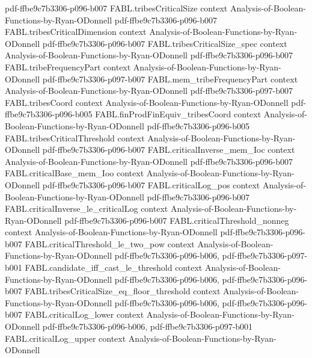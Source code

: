 \begin{theorem}
  {pdf-ffbe9c7b3306-p096-b007}
\proofstep
  {FABL.tribesCriticalSize}
  {context}
  {Analysis-of-Boolean-Functions-by-Ryan-ODonnell}
  {pdf-ffbe9c7b3306-p096-b007}
\proofstep
  {FABL.tribesCriticalDimension}
  {context}
  {Analysis-of-Boolean-Functions-by-Ryan-ODonnell}
  {pdf-ffbe9c7b3306-p096-b007}
\proofstep
  {FABL.tribesCriticalSize_spec}
  {context}
  {Analysis-of-Boolean-Functions-by-Ryan-ODonnell}
  {pdf-ffbe9c7b3306-p096-b007}
\proofstep
  {FABL.tribeFrequencyPart}
  {context}
  {Analysis-of-Boolean-Functions-by-Ryan-ODonnell}
  {pdf-ffbe9c7b3306-p097-b007}
\proofstep
  {FABL.mem_tribeFrequencyPart}
  {context}
  {Analysis-of-Boolean-Functions-by-Ryan-ODonnell}
  {pdf-ffbe9c7b3306-p097-b007}
\proofstep
  {FABL.tribesCoord}
  {context}
  {Analysis-of-Boolean-Functions-by-Ryan-ODonnell}
  {pdf-ffbe9c7b3306-p096-b005}
\proofstep
  {FABL.finProdFinEquiv_tribesCoord}
  {context}
  {Analysis-of-Boolean-Functions-by-Ryan-ODonnell}
  {pdf-ffbe9c7b3306-p096-b005}
\proofstep
  {FABL.tribesCriticalThreshold}
  {context}
  {Analysis-of-Boolean-Functions-by-Ryan-ODonnell}
  {pdf-ffbe9c7b3306-p096-b007}
\proofstep
  {FABL.criticalInverse_mem_Ioc}
  {context}
  {Analysis-of-Boolean-Functions-by-Ryan-ODonnell}
  {pdf-ffbe9c7b3306-p096-b007}
\proofstep
  {FABL.criticalBase_mem_Ioo}
  {context}
  {Analysis-of-Boolean-Functions-by-Ryan-ODonnell}
  {pdf-ffbe9c7b3306-p096-b007}
\proofstep
  {FABL.criticalLog_pos}
  {context}
  {Analysis-of-Boolean-Functions-by-Ryan-ODonnell}
  {pdf-ffbe9c7b3306-p096-b007}
\proofstep
  {FABL.criticalInverse_le_criticalLog}
  {context}
  {Analysis-of-Boolean-Functions-by-Ryan-ODonnell}
  {pdf-ffbe9c7b3306-p096-b007}
\proofstep
  {FABL.criticalThreshold_nonneg}
  {context}
  {Analysis-of-Boolean-Functions-by-Ryan-ODonnell}
  {pdf-ffbe9c7b3306-p096-b007}
\proofstep
  {FABL.criticalThreshold_le_two_pow}
  {context}
  {Analysis-of-Boolean-Functions-by-Ryan-ODonnell}
  {pdf-ffbe9c7b3306-p096-b006,
    pdf-ffbe9c7b3306-p097-b001}
\proofstep
  {FABL.candidate_iff_cast_le_threshold}
  {context}
  {Analysis-of-Boolean-Functions-by-Ryan-ODonnell}
  {pdf-ffbe9c7b3306-p096-b006,
    pdf-ffbe9c7b3306-p096-b007}
\proofstep
  {FABL.tribesCriticalSize_eq_floor_threshold}
  {context}
  {Analysis-of-Boolean-Functions-by-Ryan-ODonnell}
  {pdf-ffbe9c7b3306-p096-b006,
    pdf-ffbe9c7b3306-p096-b007}
\proofstep
  {FABL.criticalLog_lower}
  {context}
  {Analysis-of-Boolean-Functions-by-Ryan-ODonnell}
  {pdf-ffbe9c7b3306-p096-b006,
    pdf-ffbe9c7b3306-p097-b001}
\proofstep
  {FABL.criticalLog_upper}
  {context}
  {Analysis-of-Boolean-Functions-by-Ryan-ODonnell}

\end{theorem}
